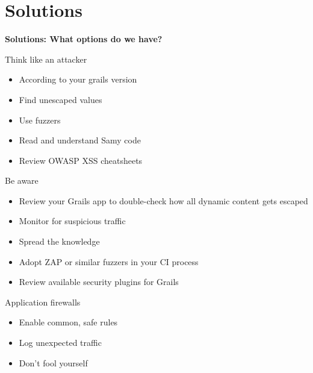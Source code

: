 
\section{Solutions}

\begin{frame}[plain]
    \begin{center}
      \Huge\bfseries
      Solutions: What options do we have?
    \end{center}
\end{frame}

\begin{frame}{Think like an attacker}
  \begin{itemize}[<+-| alert@+>]
    \item According to your grails version
    \item Find unescaped values
    \item Use fuzzers
    \item Read and understand Samy code
    \item Review OWASP XSS cheatsheets
  \end{itemize}
\end{frame}

\begin{frame}{Be aware}
  \begin{itemize}[<+-| alert@+>]
    \item Review your Grails app to double-check how all dynamic content gets escaped
    \item Monitor for suspicious traffic
    \item Spread the knowledge
    \item Adopt ZAP or similar fuzzers in your CI process
    \item Review available security plugins for Grails
  \end{itemize}
\end{frame}

\begin{frame}{Application firewalls}
 \begin{itemize}[<+-| alert@+>]
   \item Enable common, safe rules
   \item Log unexpected traffic
   \item Don't fool yourself
 \end{itemize}
\end{frame}

